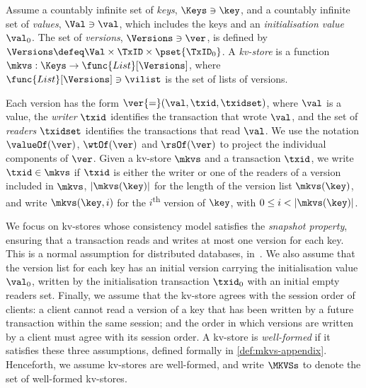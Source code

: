 \begin{definition}[Kv-stores]
\label{def:his_heap}
\label{def:mkvs}
Assume a countably infinite set of \emph{keys}, $\Keys \ni \key$, 
and a countably infinite set of  \emph{values}, $\Val \ni \val$, 
which includes the keys and an \emph{initialisation value} $\val_0$.
The set of \emph{versions}, $\Versions \ni \ver$, is defined by $\Versions \defeq \Val \times \TxID \times \pset{\TxID_{0}}$. 
A \emph{kv-store} 
is a function $\mkvs: \Keys \to \func{List}[\Versions]$, 
where $\func{List}[\Versions] \ni \vilist$ is the set of lists of versions. %
\end{definition}

Each version has the form 
$\ver {=} (\val, \txid, \txidset)$, where $\val$ is
a value, the \emph{writer} $\txid$ identifies the transaction that
wrote $\val$,  and the set of \emph{readers} $\txidset$ identifies the
transactions that read $\val$. We use the notation 
$\valueOf(\ver)$,
$\wtOf(\ver)$ and $\rsOf(\ver)$ to project
the individual components of $\ver$.
Given a kv-store $\mkvs$ and a transaction $\txid$, we write 
$\txid \in \mkvs$ if $\txid$ 
is either the writer or 
one of the readers of a version included in $\mkvs$, 
$\lvert \mkvs(\key) \rvert$ for the length of the version
list $\mkvs(\key)$,
and write $\mkvs(\key, i)$ for the $i$\textsuperscript{th} version of $\key$, 
with $0 \leq i < \lvert \mkvs(\key) \rvert$.


We focus on kv-stores whose consistency model satisfies the
\emph{snapshot property}, ensuring that
a transaction reads and writes at most one version for each key.
This is a normal assumption for distributed databases, \eg in~\cite{ramp,rola,cops,wren,redblue,PSI,NMSI,gdur,clocksi,distrsi}.
We also assume that 
the version list for each key has an initial version 
carrying the initialisation value $\val_0$,  written by the 
initialisation transaction $\txid_0$ with an initial empty readers set.
Finally, we assume that the kv-store agrees with the session order of clients: 
a client cannot read a
version of a key that has been written by a future transaction within
the same session; and the order in which versions are written by a
client must agree with its session order.  A kv-store is
\emph{well-formed} if it satisfies these three assumptions, defined
formally in \cref{def:mkvs-appendix}.  Henceforth, we assume kv-stores
are well-formed, and write $\MKVSs$ to denote the set of well-formed
kv-stores.

